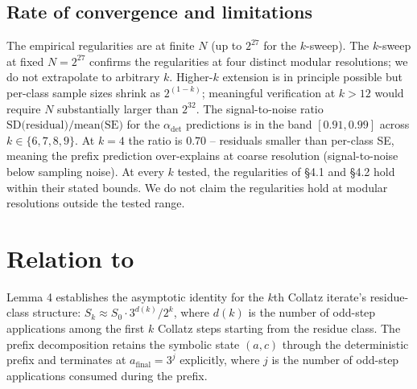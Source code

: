 \documentclass{article}
\theoremstyle{plain}
\begin{document}
\subsection{Rate of convergence and limitations}
The empirical regularities are at finite $N$ (up to $2^{27}$ for the $k$-sweep). The $k$-sweep at fixed $N=2^{27}$ confirms the regularities at four distinct modular resolutions; we do not extrapolate to arbitrary $k$. Higher-$k$ extension is in principle possible but per-class sample sizes shrink as $2^{(1-k)}$; meaningful verification at $k > 12$ would require $N$ substantially larger than $2^{32}$. The signal-to-noise ratio $\text{SD(residual)}/ \text{mean(SE)}$ for the $\alpha_{\text{det}}$ predictions is in the band $[0.91, 0.99]$ across $k \in \{6, 7, 8, 9\}$. At $k=4$ the ratio is $0.70$ -- residuals smaller than per-class SE, meaning the prefix prediction over-explains at coarse resolution (signal-to-noise below sampling noise). At every $k$ tested, the regularities of \S4.1 and \S4.2 hold within their stated bounds. We do not claim the regularities hold at modular resolutions outside the tested range.

\section{Relation to \citep{terras1976}}
\citet{terras1976} Lemma 4 establishes the asymptotic identity for the $k$th Collatz iterate's residue-class structure: $S_k \approx S_0 \cdot 3^{d(k)}/ 2^k$, where $d(k)$ is the number of odd-step applications among the first $k$ Collatz steps starting from the residue class. The prefix decomposition retains the symbolic state $(a,c)$ through the deterministic prefix and terminates at $a_{\text{final}} = 3^j$ explicitly, where $j$ is the number of odd-step applications consumed during the prefix.
\end{document}
